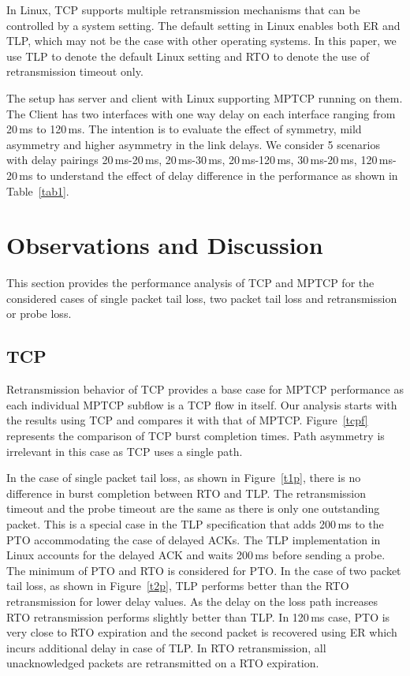 \documentclass[10pt,conference]{IEEEtran}
\begin{document}
In Linux, TCP supports multiple retransmission mechanisms that can be controlled by a system setting. The default setting in Linux enables both
ER and TLP, which may not be the case with other operating systems. In this paper, we use TLP to denote the default Linux setting and RTO to denote
the use of retransmission timeout only.


The setup has server and client with Linux supporting MPTCP running on them. The Client has two interfaces with one way delay on each interface 
ranging from 20\,ms to 120\,ms. The intention is to evaluate the effect of symmetry, mild asymmetry and higher asymmetry in the link delays. We 
consider 5 scenarios with delay pairings 20\,ms-20\,ms, 20\,ms-30\,ms, 20\,ms-120\,ms, 30\,ms-20\,ms, 120\,ms-20\,ms to understand the effect of
delay difference in the performance as shown in Table~\ref{tab1}.


\section{Observations and Discussion}\label{disc}
This section provides the performance analysis of TCP and MPTCP for the considered cases of single packet tail loss, two packet tail loss and 
retransmission or probe loss.
\subsection{TCP}
Retransmission behavior of TCP provides a base case for MPTCP performance as each individual MPTCP subflow is a TCP flow in itself. Our analysis
starts with the results using TCP and compares it with that of MPTCP. Figure~\ref{tcpf} represents the comparison of TCP burst completion times. Path
asymmetry is irrelevant in this case as TCP uses a single path.

In the case of single packet tail loss, as shown in Figure~\ref{t1p}, there is no difference in burst completion between RTO and TLP. The 
retransmission timeout and the probe timeout are the same as there is only one outstanding packet. This is a special case in the TLP
specification that adds 200\,ms to the PTO accommodating the case of delayed ACKs. The TLP implementation in Linux accounts for the delayed 
ACK and waits 200\,ms before sending a probe. The minimum of PTO and RTO is considered for PTO. In the case of two packet tail loss, as shown 
in Figure~\ref{t2p}, TLP performs better than the RTO retransmission for lower delay values. As the delay on the loss path increases RTO retransmission performs 
slightly better than TLP. In 120\,ms case, PTO is very close to RTO expiration and the second packet is recovered using ER which incurs additional 
delay in case of TLP. In RTO retransmission, all unacknowledged packets are retransmitted on a RTO expiration. 
\end{document}
